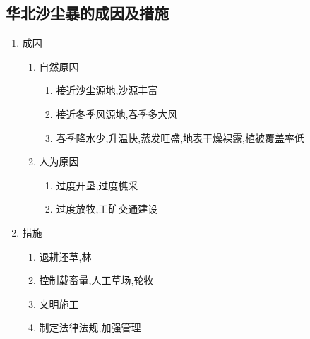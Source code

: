 \documentclass[a4paper]{article}
\begin{document}
    \subsection{华北沙尘暴的成因及措施}
    \begin{enumerate}
        \item 成因
        \begin{enumerate}
            \item 自然原因
            \begin{enumerate}
                \item 接近沙尘源地,沙源丰富
                \item 接近冬季风源地,春季多大风
                \item 春季降水少,升温快,蒸发旺盛,地表干燥裸露,植被覆盖率低
            \end{enumerate}
            \item 人为原因
            \begin{enumerate}
                \item 过度开垦,过度樵采
                \item 过度放牧,工矿交通建设
            \end{enumerate}
        \end{enumerate}
        \item 措施
        \begin{enumerate}
            \item 退耕还草,林
            \item 控制载畜量,人工草场,轮牧
            \item 文明施工
            \item 制定法律法规,加强管理
        \end{enumerate}
    \end{enumerate}
\end{document}

